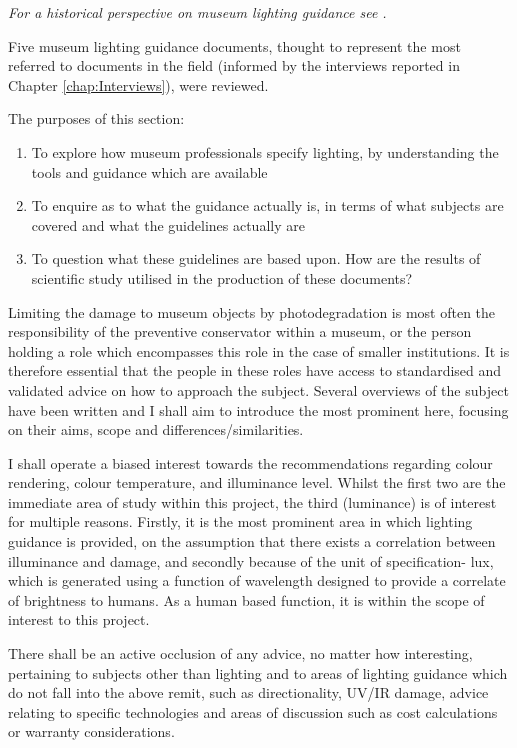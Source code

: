 \textit{For a historical perspective on museum lighting guidance see \citet{druzik_museum_2007}.}

Five museum lighting guidance documents, thought to represent the most referred to documents in the field (informed by the interviews reported in Chapter \ref{chap:Interviews}), were reviewed. 

The purposes of this section:
\begin{enumerate}
\item To explore how museum professionals specify lighting, by understanding the tools and guidance which are available
\item To enquire as to what the guidance actually is, in terms of what subjects are covered and what the guidelines actually are
\item To question what these guidelines are based upon. How are the results of scientific study utilised in the production of these documents?
\end{enumerate}

Limiting the damage to museum objects by photodegradation is most often the responsibility of the preventive conservator within a museum, or the person holding a role which encompasses this role in the case of smaller institutions. It is therefore essential that the people in these roles have access to standardised and validated advice on how to approach the subject. Several overviews of the subject have been written and I shall aim to introduce the most prominent here, focusing on their aims, scope and differences/similarities. 

I shall operate a biased interest towards the recommendations regarding colour rendering, colour temperature, and illuminance level. Whilst the first two are the immediate area of study within this project, the third (luminance) is of interest for multiple reasons. Firstly, it is the most prominent area in which lighting guidance is provided, on the assumption that there exists a correlation between illuminance and damage, and secondly because of the unit of specification- lux, which is generated using a function of wavelength designed to provide a correlate of brightness to humans. As a human based function, it is within the scope of interest to this project.

There shall be an active occlusion of any advice, no matter how interesting, pertaining to subjects other than lighting and to areas of lighting guidance which do not fall into the above remit, such as directionality, UV/IR damage, advice relating to specific technologies and areas of discussion such as cost calculations or warranty considerations. 

